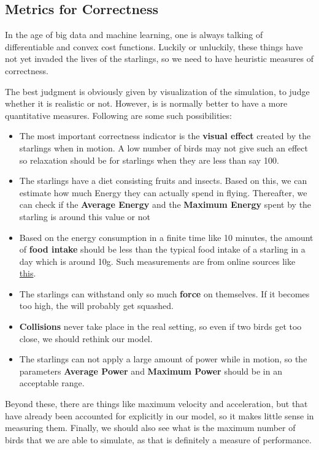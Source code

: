 \documentclass{article}
\begin{document}
\subsection{Metrics for Correctness}
In the age of big data and machine learning, one is always talking of differentiable and convex cost functions. Luckily or unluckily, these things have not yet invaded the lives of the starlings, so we need to have heuristic measures of correctness.

The best judgment is obviously given by visualization of the simulation, to judge whether it is realistic or not. However, is is normally better to have a more quantitative measures. Following are some such possibilities:
\begin{itemize}
	\item The most important correctness indicator is the \textbf{visual effect} created by the starlings when in motion. A low number of birds may not give such an effect so relaxation should be for starlings when they are less than say 100.
    \item The starlings have a diet consisting fruits and insects. Based on this, we can estimate how much Energy they can actually spend in flying. Thereafter, we can check if the \textbf{Average Energy} and the \textbf{Maximum Energy} spent by the starling is around this value or not
    \item Based on the energy consumption in a finite time like 10 minutes, the amount of \textbf{food intake} should be less than the typical food intake of a starling in a day which is around 10g. Such measurements are from online sources like \href{https://www.tandfonline.com/doi/pdf/10.1080/00063657309476384}{this}.
    \item The starlings can withstand only so much \textbf{force} on themselves. If it becomes too high, the will probably get squashed. 
    \item \textbf{Collisions} never take place in the real setting, so even if two birds get too close, we should rethink our model. 
    \item The starlings can not apply a large amount of power while in motion, so the parameters \textbf{Average Power} and \textbf{Maximum Power} should be in an acceptable range.
\end{itemize}
Beyond these, there are things like maximum velocity and acceleration, but that have already been accounted for explicitly in our model, so it makes little sense in measuring them. Finally, we should also see what is the maximum number of birds that we are able to simulate, as that is definitely a measure of performance.
\end{document}
